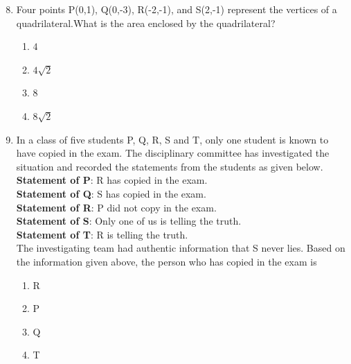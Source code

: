 \documentclass[journal]{IEEEtran}
\theoremstyle{remark}
\begin{document}
\begin{enumerate}[itemsep=1em]
\setcounter{enumi}{7}
\item Four points P(0,1), Q(0,-3), R(-2,-1),  and S(2,-1) represent the vertices of a quadrilateral.What is the area enclosed by the quadrilateral? 
\begin{multicols}{4}
\begin{enumerate}
    \item $4$
    \item $4\sqrt{2}$
    \item $8$
    \item $8\sqrt{2}$
\end{enumerate}
\end{multicols}
\end{enumerate}

\newpage
\vspace*{0.25cm}

\begin{enumerate}[itemsep=1em]
\setcounter{enumi}{8}
\item In a class of five students P, Q, R, S and T, only one student is known to have copied in the exam. The disciplinary committee has investigated the situation and recorded the statements from the students as given below.\\
\textbf{Statement of P}: R has copied in the exam. \\
\textbf{Statement of Q}: S has copied in the exam. \\
\textbf{Statement of R}: P did not copy in the exam. \\
\textbf{Statement of S}: Only one of us is telling the truth. \\
\textbf{Statement of T}: R is telling the truth. \\
The investigating team had authentic information that S never lies. Based on the information given above, the person who has copied in the exam is 
\begin{multicols}{4}
\begin{enumerate}
    \item R
    \item P
    \item Q
    \item T
\end{enumerate}
\end{multicols}
\end{enumerate}
\end{document}
